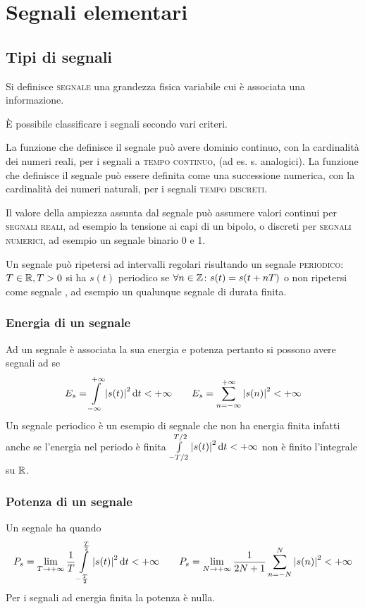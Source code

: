\chapter{Segnali elementari}
\section{Tipi di segnali}
Si definisce \textsc{segnale} una grandezza fisica variabile cui è associata una informazione.

\`{E} possibile classificare i segnali secondo vari criteri.

La funzione che definisce il segnale può avere dominio continuo, con la cardinalità dei numeri reali, per i segnali a \textsc{tempo continuo}, (ad es. s. analogici). La funzione che definisce il segnale può essere definita come una successione numerica, con la cardinalità dei numeri naturali, per i segnali \textsc{tempo discreti}.

Il valore della ampiezza assunta dal segnale può assumere valori continui per \textsc{segnali reali}, ad esempio la tensione ai capi di un bipolo, o discreti per \textsc{segnali numerici}, ad esempio un segnale binario 0 e 1.

Un segnale può ripetersi ad intervalli regolari risultando un segnale \textsc{periodico}: $T\in\mathbb{R}, T>0$ si ha $s(t)$ periodico se $\forall n\in\mathbb{Z}\colon s(t)=s(t+n T)$
o non ripetersi come segnale , ad esempio un qualunque segnale di durata finita.

\subsection{Energia di un segnale}
Ad un segnale è associata la sua energia e potenza pertanto si possono avere segnali ad  se \begin{equation}\label{eq:segnale_energia}E_s=\int\limits_{-\infty}^{+\infty}{\left|{s(t)}\right|^2}{\,\mathop{}\!\mathrm{d}{t}}<+\infty \qquad E_s=\sum_{n=-\infty}^{+\infty}\left|{s(n)}\right|^2 <+\infty\end{equation}
Un segnale periodico è un esempio di segnale che non ha energia finita infatti anche se l'energia nel periodo è finita $\int\limits_{-T/2}^{T/2}{\left|{s(t)}\right|^2}{\,\mathop{}\!\mathrm{d}{t}}<+\infty$ non è finito l'integrale su $\mathbb{R}$.

\subsection{Potenza di un segnale}
Un segnale ha  quando \begin{equation}\label{eq:segnale_potenza}P_s=\lim\limits_{T\to+\infty}{\frac{1}{T}\int\limits_{-\frac{T}{2}}^{\frac{T}{2}}{\left|{s(t)}\right|^2}{\,\mathop{}\!\mathrm{d}{t}}<+\infty}   \qquad  P_s=\lim\limits_{N\to+\infty}{\frac{1}{2N+1}\sum_{n=-N}^{N}{\left|{s(n)}\right|^2}<+\infty}\end{equation}
Per i segnali ad energia finita la potenza è nulla.

